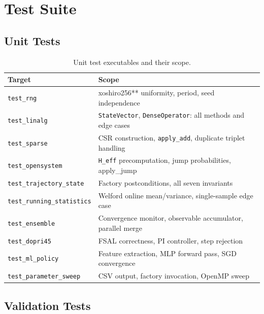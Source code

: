 \documentclass[11pt,a4paper,twoside]{book}
\newcommand{\code}[1]{\texttt{\small#1}}
\theoremstyle{definition}
\theoremstyle{remark}
\begin{document}
\chapter{Test Suite}
\label{chap:tests}

\section{Unit Tests}
\label{sec:unit-tests}

\begin{table}[H]
\centering
\caption{Unit test executables and their scope.}
\label{tab:unit-tests}
\begin{tabularx}{\linewidth}{L{48mm}X}
\toprule
\textbf{Target} & \textbf{Scope} \\
\midrule
\code{test\_rng}              & xoshiro256** uniformity, period, seed independence \\
\code{test\_linalg}           & \code{StateVector}, \code{DenseOperator}: all methods and edge cases \\
\code{test\_sparse}           & CSR construction, \code{apply\_add}, duplicate triplet handling \\
\code{test\_opensystem}       & \code{H\_eff} precomputation, jump probabilities, apply\_jump \\
\code{test\_trajectory\_state}& Factory postconditions, all seven invariants \\
\code{test\_running\_statistics}& Welford online mean/variance, single-sample edge case \\
\code{test\_ensemble}         & Convergence monitor, observable accumulator, parallel merge \\
\code{test\_dopri45}          & FSAL correctness, PI controller, step rejection \\
\code{test\_ml\_policy}       & Feature extraction, MLP forward pass, SGD convergence \\
\code{test\_parameter\_sweep} & CSV output, factory invocation, OpenMP sweep \\
\bottomrule
\end{tabularx}
\end{table}

\section{Validation Tests}
\label{sec:validation-tests}
\end{document}
